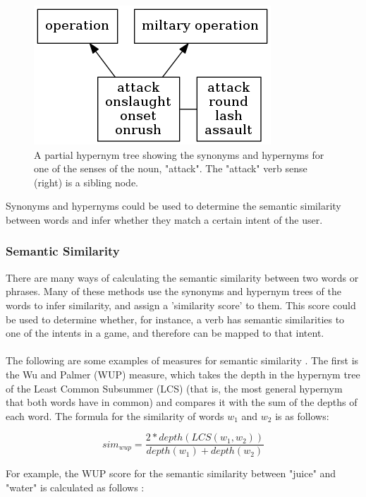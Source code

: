 \documentclass[12pt]{article}
\begin{document}
\begin{center}
\begin{figure}[H]
\begin{center}
  \includegraphics[scale=1]{hypernym-tree.png}
  \caption{A partial hypernym tree showing the synonyms and hypernyms for one of the senses of the noun, "attack". The "attack" verb sense (right) is a sibling node.}
  \end{center}
\end{figure}
\end{center}

Synonyms and hypernyms could be used to determine the semantic similarity between words and infer whether they match a certain intent of the user.

\subsubsection{Semantic Similarity}

There are many ways of calculating the semantic similarity between two words or phrases. Many of these methods use the synonyms and hypernym trees of the words to infer similarity, and assign a 'similarity score' to them. This score could be used to determine whether, for instance, a verb has semantic similarities to one of the intents in a game, and therefore can be mapped to that intent.
\\
\\
The following are some examples of measures for semantic similarity \cite{RefWorks:46}. The first is the Wu and Palmer (WUP) measure, which takes the depth in the hypernym tree of the Least Common Subsummer (LCS) (that is, the most general hypernym that both words have in common) and compares it with the sum of the depths of each word. The formula for the similarity of words $w_1$ and $w_2$ is as follows:

$$sim_{wup} = \frac{2*depth(LCS(w_1,w_2))}{depth(w_1)+depth(w_2)}$$

For example, the WUP score for the semantic similarity between "juice" and "water" is calculated as follows \cite{RefWorks:49}:
\end{document}
